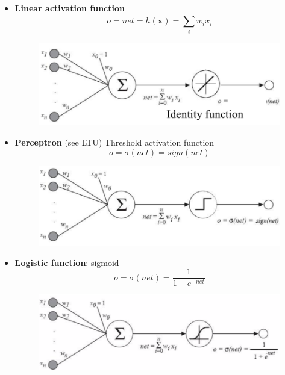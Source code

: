 \documentclass[../main.tex]{subfiles}
\begin{document}
\begin{itemize}
    \item \textbf{Linear activation function}
    $$ o = net = h(\mathbf{x}) = \sum_{i}^{} w_ix_i$$
    \begin{figure}[H]
        \centering
        \includegraphics[scale = 0.3]{lectures/4_neural_networks/4_activation_function_linear_act.png}
    \end{figure}
    
    \item \textbf{Perceptron} (see LTU) Threshold activation function
    $$ o = \sigma(net) =  sign(net)$$
    \begin{figure}[H]
        \centering
        \includegraphics[scale = 0.3]{lectures/4_neural_networks/4_activation_function_ltu.png}
    \end{figure}
    
    \item \textbf{Logistic function}: sigmoid
    $$ o = \sigma(net) =  \frac{1}{1 - e^{-net}}$$
    \begin{figure}[H]
        \centering
        \includegraphics[scale = 0.3]{lectures/4_neural_networks/4_activation_function_sigmoid.png}
    \end{figure}
\end{itemize}
\end{document}
